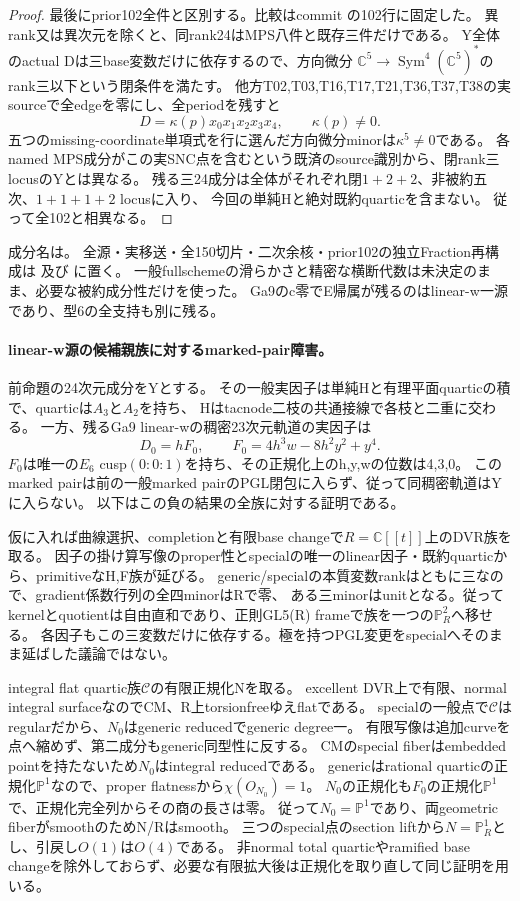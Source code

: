 \documentclass[a4paper,11pt]{ltjsarticle}
\theoremstyle{definition}
\begin{document}
\begin{proof}
最後にprior102全件と区別する。比較はcommit
の102行に固定した。
異rank又は異次元を除くと、同rank24はMPS八件と既存三件だけである。
Y全体のactual Dは三base変数だけに依存するので、方向微分
$\mathbb C^5\to\operatorname{Sym}^4(\mathbb C^5)^*$のrank三以下という閉条件を満たす。
他方T02,T03,T16,T17,T21,T36,T37,T38の実sourceで全edgeを零にし、全periodを残すと
\[
 D=\kappa(p)x_0x_1x_2x_3x_4,\qquad\kappa(p)\ne0.
\]
五つのmissing-coordinate単項式を行に選んだ方向微分minorは$\kappa^5\ne0$である。
各named MPS成分がこの実SNC点を含むという既済のsource識別から、閉rank三locusのYとは異なる。
残る三24成分は全体がそれぞれ閉$1+2+2$、非被約五次、$1+1+1+2$ locusに入り、
今回の単純Hと絶対既約quarticを含まない。
従って全102と相異なる。
\end{proof}
成分名は。
全源・実移送・全150切片・二次余核・prior102の独立Fraction再構成は
及び
に置く。
一般fullschemeの滑らかさと精密な横断代数は未決定のまま、必要な被約成分性だけを使った。
Ga9のc零でE帰属が残るのはlinear-w一源であり、型6の全支持も別に残る。

\paragraph{linear-w源の候補親族に対するmarked-pair障害。}
前命題の24次元成分をYとする。
その一般実因子は単純Hと有理平面quarticの積で、quarticは$A_3$と$A_2$を持ち、
Hはtacnode二枝の共通接線で各枝と二重に交わる。
一方、残るGa9 linear-wの稠密23次元軌道の実因子は
\[
 D_0=hF_0,\qquad F_0=4h^3w-8h^2y^2+y^4.
\]
$F_0$は唯一の$E_6$ cusp$(0:0:1)$を持ち、その正規化上のh,y,wの位数は4,3,0。
このmarked pairは前の一般marked pairのPGL閉包に入らず、従って同稠密軌道はYに入らない。
以下はこの負の結果の全族に対する証明である。

仮に入れば曲線選択、completionと有限base changeで$R=\mathbb C[[t]]$上のDVR族を取る。
因子の掛け算写像のproper性とspecialの唯一のlinear因子・既約quarticから、primitiveなH,F族が延びる。
generic/specialの本質変数rankはともに三なので、gradient係数行列の全四minorはRで零、
ある三minorはunitとなる。従ってkernelとquotientは自由直和であり、正則GL5(R) frameで族を一つの$\mathbb P^2_R$へ移せる。
各因子もこの三変数だけに依存する。極を持つPGL変更をspecialへそのまま延ばした議論ではない。

integral flat quartic族$\mathcal C$の有限正規化Nを取る。
excellent DVR上で有限、normal integral surfaceなのでCM、R上torsionfreeゆえflatである。
specialの一般点で$\mathcal C$はregularだから、$N_0$はgeneric reducedでgeneric degree一。
有限写像は追加curveを点へ縮めず、第二成分もgeneric同型性に反する。
CMのspecial fiberはembedded pointを持たないため$N_0$はintegral reducedである。
genericはrational quarticの正規化$\mathbb P^1$なので、proper flatnessから$\chi(O_{N_0})=1$。
$N_0$の正規化も$F_0$の正規化$\mathbb P^1$で、正規化完全列からその商の長さは零。
従って$N_0=\mathbb P^1$であり、両geometric fiberがsmoothのためN/Rはsmooth。
三つのspecial点のsection liftから$N=\mathbb P^1_R$とし、引戻し$O(1)$は$O(4)$である。
非normal total quarticやramified base changeを除外しておらず、必要な有限拡大後は正規化を取り直して同じ証明を用いる。
\end{document}
